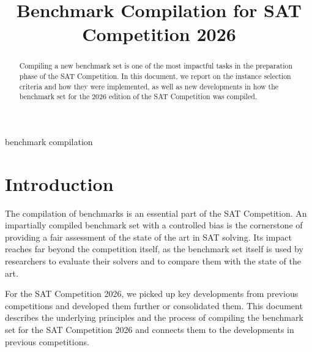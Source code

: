 \documentclass[conference]{IEEEtran}
\begin{document}
\title{Benchmark Compilation for SAT Competition 2026}

\author{
\and
{}
\and
{}
}
\maketitle

\begin{abstract}
Compiling a new benchmark set is one of the most impactful tasks in the preparation phase of the SAT Competition. 
In this document, we report on the instance selection criteria and how they were implemented, as well as new developments in how the benchmark set for the 2026 edition of the SAT Competition was compiled.
\end{abstract}

\begin{IEEEkeywords}
benchmark compilation
\end{IEEEkeywords}

\section{Introduction}

The compilation of benchmarks is an essential part of the SAT Competition.
An impartially compiled benchmark set with a controlled bias is the cornerstone of providing a fair assessment of the state of the art in SAT solving.
Its impact reaches far beyond the competition itself, as the benchmark set itself is used by researchers to evaluate their solvers and to compare them with the state of the art.

For the SAT Competition 2026, we picked up key developments from previous competitions and developed them further or consolidated them.
This document describes the underlying principles and the process of compiling the benchmark set for the SAT Competition 2026 and connects them to the developments in previous competitions.
\end{document}
